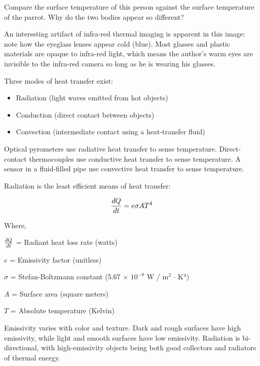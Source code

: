 Compare the surface temperature of this person against the surface temperature of the parrot.  Why do the two bodies appear so different?

\vskip 10pt

An interesting artifact of infra-red thermal imaging is apparent in this image: note how the eyeglass lenses appear cold (blue).  Most glasses and plastic materials are opaque to infra-red light, which means the author's warm eyes are invisible to the infra-red camera so long as he is wearing his glasses.














Three modes of heat transfer exist:

\begin{itemize}
\item{} Radiation (light waves emitted from hot objects)
\item{} Conduction (direct contact between objects)
\item{} Convection (intermediate contact using a heat-transfer fluid)
\end{itemize}

Optical pyrometers use radiative heat transfer to sense temperature.  Direct-contact thermocouples use conductive heat transfer to sense temperature.  A sensor in a fluid-filled pipe use convective heat transfer to sense temperature.

\vskip 10pt

Radiation is the least efficient means of heat transfer:

$${dQ \over dt} = e \sigma A T^4$$

\noindent
Where,

$dQ \over dt$ = Radiant heat loss rate (watts)

$e$ = Emissivity factor (unitless)

$\sigma$ = Stefan-Boltzmann constant (5.67 $\times$ $10^{-8}$ W / m$^{2}$ $\cdot$ K$^{4}$)

$A$ = Surface area (square meters)

$T$ = Absolute temperature (Kelvin)

\vskip 10pt

Emissivity varies with color and texture.  Dark and rough surfaces have high emissivity, while light and smooth surfaces have low emissivity.  Radiation is bi-directional, with high-emissivity objects being both good collectors and radiators of thermal energy.

